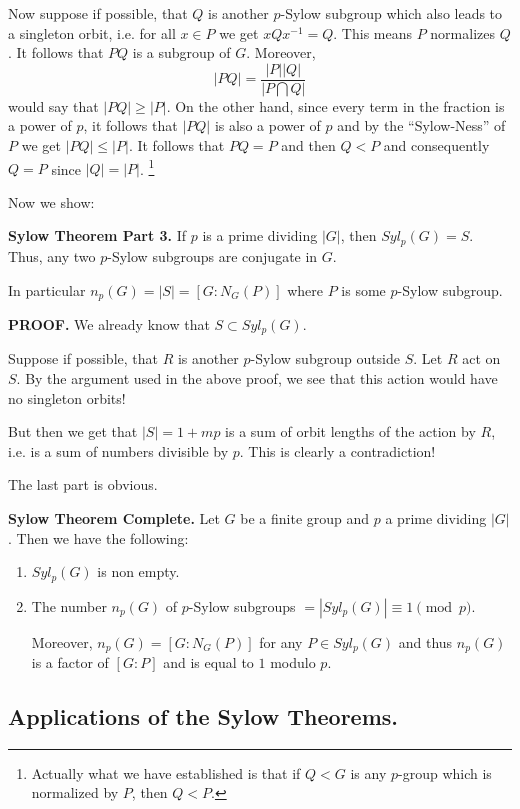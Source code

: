 \documentclass[12pt]{article}
\begin{document}
Now suppose if possible, that $Q$ is another $p$-Sylow subgroup which also leads to a
singleton orbit, i.e. for all $x\in P$ we get $xQx^{-1}=Q$. This means $P$
normalizes $Q$. It follows that $PQ$ is a subgroup of $G$. Moreover,
$$|PQ| = \frac{|P||Q|}{|P\bigcap Q|}$$
would say that $|PQ|\geq |P|$. On the other hand, since every term in
the fraction is a power of $p$, it follows that $|PQ|$ is also a power
of $p$ and by the ``Sylow-Ness'' of $P$ we get $|PQ|\leq |P|$.
It follows that $PQ=P$ and then $Q<P$ and consequently $Q=P$ since
$|Q|=|P|$.
\footnote{Actually what we have established is that if $Q<G$ is any
$p$-group which is normalized by $P$, then $Q<P$.}

Now we show:

{\bf Sylow Theorem Part 3.} If $p$ is a prime dividing $|G|$, then $Syl_p(G) = S$.
Thus, any two $p$-Sylow subgroups are conjugate in $G$.

In particular $n_p(G) = |S| =  [G:N_G(P)]$ where $P$ is some $p$-Sylow
subgroup. 

{\bf PROOF.}
We already know that $S\subset Syl_p(G)$.

Suppose if possible, that $R$ is another $p$-Sylow subgroup outside $S$.
Let $R$ act on $S$. By the argument used in the above proof, we see that
this action would have no singleton orbits!

But then we get that $|S|=1+mp$ is a sum of orbit lengths of the action
by $R$, i.e. is a sum of numbers divisible by $p$. This is clearly a
contradiction!

The last part is obvious.

{\bf Sylow Theorem Complete.}
Let $G$ be a finite group and $p$ a prime dividing $|G|$.
Then we have the following:
\begin{enumerate}
\item $Syl_p(G)$ is non empty.
\item The number $n_p(G)$ of $p$-Sylow subgroups $=|Syl_p(G)|\equiv 1 \pmod{p}$.

Moreover, $n_p(G)=[G:N_G(P)]$ for any $P\in Syl_p(G)$ and thus $n_p(G)$
is a factor of $[G:P]$ and is equal to $1$ modulo $p$.


\end{enumerate}
\subsection{Applications of the Sylow Theorems.}
\end{document}
